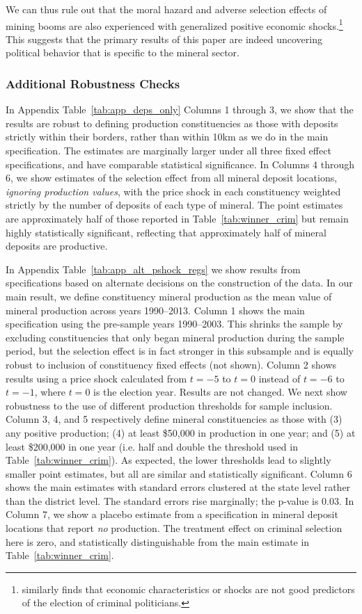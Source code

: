 \documentclass[12pt,letterpaper]{article}
\begin{document}
We can thus rule out that the moral hazard and adverse selection
effects of mining booms are also experienced with generalized positive
economic shocks.\footnote{ similarly finds
  that economic characteristics or shocks are not good predictors of
  the election of criminal politicians.}  This suggests that the
primary results of this paper are indeed uncovering political behavior
that is specific to the mineral sector.

\subsubsection{Additional Robustness Checks}

In Appendix Table~\ref{tab:app_deps_only}
Columns 1 through 3, we show that the results are robust to defining
production constituencies as those with deposits strictly within their
borders, rather than within 10km as we do in the main
specification. The estimates are marginally larger under all three
fixed effect specifications, and have comparable statistical
significance. In Columns 4 through 6, we show estimates of the
selection effect from all mineral deposit locations, \textit{ignoring
  production values}, with the price shock in each constituency
weighted strictly by the number of deposits of each type of
mineral. The point estimates are approximately half of those reported
in Table~\ref{tab:winner_crim} but remain highly statistically
significant, reflecting that approximately half of mineral deposits
are productive. 

In Appendix Table~\ref{tab:app_alt_pshock_regs} we show results from
specifications based on alternate decisions on the construction of the
data. In our main result, we define constituency mineral production as
the mean value of mineral production across years 1990--2013. Column 1
shows the main specification using the pre-sample years
1990--2003. This shrinks the sample by excluding constituencies that
only began mineral production during the sample period, but the
selection effect is in fact stronger in this subsample and is equally
robust to inclusion of constituency fixed effects (not shown). Column
2 shows results using a price shock calculated from $t=-5$ to $t=0$
instead of $t=-6$ to $t=-1$, where $t=0$ is the election year. Results
are not changed. We next show robustness to the use of different
production thresholds for sample inclusion. Column 3, 4, and 5
respectively define mineral constituencies as those with (3) any
positive production; (4) at least \$50,000 in production in one year;
and (5) at least \$200,000 in one year (i.e. half and double the
threshold used in Table~\ref{tab:winner_crim}). As expected, the lower
thresholds lead to slightly smaller point estimates, but all are
similar and statistically significant.  Column 6 shows the main
estimates with standard errors clustered at the state level rather
than the district level. The standard errors rise marginally; the
p-value is 0.03. In Column 7, we show a placebo estimate from a
specification in mineral deposit locations that report \textit{no}
production. The treatment effect on criminal selection here is zero,
and statistically distinguishable from the main estimate in
Table~\ref{tab:winner_crim}.
\end{document}
